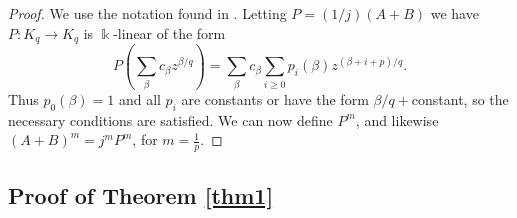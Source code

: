 \documentclass[11pt]{amsart}
\theoremstyle{plain}
\theoremstyle{definition}
\theoremstyle{remark}
\begin{document}
\begin{proof}
    We use the notation found in \cite[Section 7.1]{dima}.  Letting $P=(1/j)(A+B)$ we have $P\colon K_q\to K_q$ is $\Bbbk$-linear of the form
    $$P\left(\sum_{\beta}c_{\beta}z^{\beta/q} \right)=\sum_{\beta}c_{\beta}\sum_{i\geq 0}p_i(\beta)z^{(\beta+i+p)/q}.$$
    Thus $p_0(\beta)=1$ and all $p_i$ are constants or have the form $\beta/q+$constant, so the necessary conditions \cite[Section 7.1, conditions (1) and (2)]{dima} are satisfied.  We can now define $P^m$, and likewise $(A+B)^m=j^mP^m$, for $m=\frac{1}{p}$.
\end{proof}


\subsection{Proof of Theorem \ref{thm1}}\label{subsec proof1}
\end{document}
